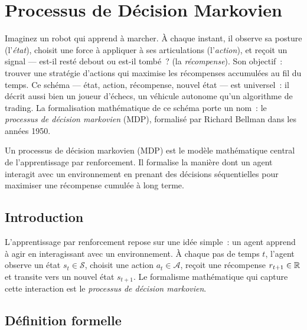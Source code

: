 \chapter{Processus de D\'ecision Markovien}
\label{ch:mdp}

Imaginez un robot qui apprend \`a marcher. \`A chaque instant, il observe sa
posture (l'\emph{\'etat}), choisit une force \`a appliquer \`a ses articulations
(l'\emph{action}), et re\c{c}oit un signal --- est-il rest\'e debout ou
est-il tomb\'e~? (la \emph{r\'ecompense}). Son objectif~: trouver une strat\'egie
d'actions qui maximise les r\'ecompenses accumul\'ees au fil du temps. Ce
sch\'ema --- \'etat, action, r\'ecompense, nouvel \'etat --- est universel~: il
d\'ecrit aussi bien un joueur d'\'echecs, un v\'ehicule autonome qu'un
algorithme de trading. La formalisation math\'ematique de ce sch\'ema porte un
nom~: le \emph{processus de d\'ecision markovien} (MDP), formalis\'e par
Richard Bellman dans les ann\'ees 1950.

\begin{intuition}
Un processus de d\'ecision markovien (MDP) est le mod\`ele math\'ematique central
de l'apprentissage par renforcement. Il formalise la mani\`ere dont un agent
interagit avec un environnement en prenant des d\'ecisions s\'equentielles pour
maximiser une r\'ecompense cumul\'ee \`a long terme.
\end{intuition}

\section{Introduction}

L'apprentissage par renforcement repose sur une id\'ee simple~: un agent apprend
\`a agir en interagissant avec un environnement. \`A chaque pas de temps $t$,
l'agent observe un \'etat $s_t \in \mathcal{S}$, choisit une action
$a_t \in \mathcal{A}$, re\c{c}oit une r\'ecompense $r_{t+1} \in \mathbb{R}$ et
transite vers un nouvel \'etat $s_{t+1}$. Le formalisme math\'ematique qui
capture cette interaction est le \emph{processus de d\'ecision markovien}.

\section{D\'efinition formelle}

